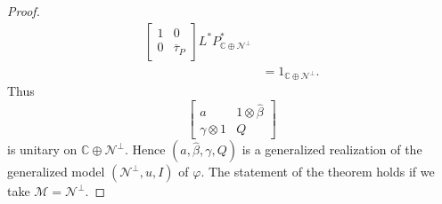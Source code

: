 \documentclass[11pt, reqno]{amsart}
\newcommand\1{\boldsymbol {1}}
\numberwithin{equation}{section}
\begin{document}
\begin{proof}
\begin{align*}
\begin{bmatrix}
    1 & 0 \\
    0& \overline{\tau}_{P}
\end{bmatrix}L^{*}P^{*}_{\mathbb{C}\oplus\mathcal{N}^{\perp}} \\
&= 1_{\mathbb{C}\oplus\mathcal{N}^{\perp}}.
\end{align*}
Thus 
$$\begin{bmatrix}
    a & 1\otimes {\hat{\beta}} \\
    \gamma\otimes 1 & Q
\end{bmatrix}$$
is unitary on $\mathbb{C}\oplus\mathcal{N}^{\perp}$. Hence $(a,{\hat{\beta}},\gamma,Q)$ is a generalized realization of the generalized model $(\mathcal{N}^{\perp},u,I)$ of $\varphi$. The statement of the theorem holds if we take $\mathcal{M}=\mathcal{N}^{\perp}$.\end{proof}
\end{document}
